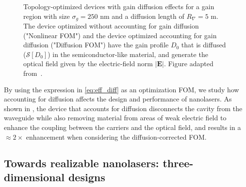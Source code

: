 \begin{figure}[tb]
    \centering
    \caption{Topology-optimized devices with gain diffusion effects for a gain region with size $\sigma_g=250$ nm and a diffusion length of $R_\nabla=5$ \textmu m. The device optimized without accounting for gain diffusion ("Nonlinear FOM") and the device optimized accounting for gain diffusion ("Diffusion FOM") have the gain profile $D_0$ that is diffused ($\mathcal{S}[D_0]$)
    in the semiconductor-like material, and generate the optical field given by the electric-field norm $\vert \mathbf{E} \vert$. Figure adapted from~\cite{ownpub4}.}
    \label{fig:laser_diff}
\end{figure}

By using the expression in \eqref{eq:eff_diff} as an optimization FOM, we study how accounting for diffusion
affects the design and performance of nanolasers. As shown in , the device that accounts for diffusion disconnects the cavity from the waveguide while also removing
material from areas of weak electric field to 
enhance the coupling between the carriers and the optical field, and results in a $\approx 2\times$ enhancement when considering the diffusion-corrected FOM. 

\subsection*{Towards realizable nanolasers: three-dimensional designs}

